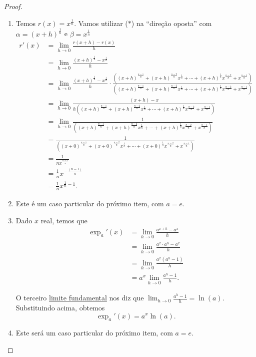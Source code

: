 \begin{proof}
\begin{enumerate}
		\item Temos $r(x)=x^{\frac{1}{n}}$.  Vamos utilizar ($*$) na ``direção oposta'' com $\alpha=(x+h)^{\frac{1}{n}}$ e $\beta=x^{\frac{1}{n}}$
		\begin{align*}
			r'(x)
				&=\lim_{h\to 0}\frac{r(x+h)-r(x)}{h}\\
				&=\lim_{h\to 0}\frac{(x+h)^{\frac{1}{n}}-x^{\frac{1}{n}}}{h}\\
				&=\lim_{h\to 0}\frac{(x+h)^{\frac{1}{n}}-x^{\frac{1}{n}}}{h}\cdot\frac{\left((x+h)^{\frac{n-1}{n}}+(x+h)^{\frac{n-2}{n}}x^{\frac{1}{n}}+\cdots+(x+h)^{\frac{1}{n}}x^{\frac{n-2}{n}}+x^{\frac{n-1}{n}}\right)}{\left((x+h)^{\frac{n-1}{n}}+(x+h)^{\frac{n-2}{n}}x^{\frac{1}{n}}+\cdots+(x+h)^{\frac{1}{n}}x^{\frac{n-2}{n}}+x^{\frac{n-1}{n}}\right)}\\
				&=\lim_{h\to 0}\frac{(x+h)-x}{h\left((x+h)^{\frac{n-1}{n}}+(x+h)^{\frac{n-2}{n}}x^{\frac{1}{n}}+\cdots+(x+h)^{\frac{1}{n}}x^{\frac{n-2}{n}}+x^{\frac{n-1}{n}}\right)}\\
				&=\lim_{h\to 0}\frac{1}{\left((x+h)^{\frac{n-1}{n}}+(x+h)^{\frac{n-2}{n}}x^{\frac{1}{n}}+\cdots+(x+h)^{\frac{1}{n}}x^{\frac{n-2}{n}}+x^{\frac{n-1}{n}}\right)}\\
				&=\frac{1}{\left((x+0)^{\frac{n-1}{n}}+(x+0)^{\frac{n-2}{n}}x^{\frac{1}{n}}+\cdots+(x+0)^{\frac{1}{n}}x^{\frac{n-2}{n}}+x^{\frac{n-1}{n}}\right)}\\
				&=\frac{1}{nx^{\frac{n-1}{n}}}\\
				&=\frac{1}{n}x^{-\frac{(n-1)}{n}}\\
				&=\frac{1}{n}x^{\frac{1}{n}-1}.
		\end{align*}
		
		\item Este é um caso particular do próximo item, com $a=e$.
		
		\item Dado $x$ real, temos que
		\begin{align*}
			\exp_a'(x)
				&=\lim_{h\to 0}\frac{a^{x+h}-a^x}{h}\\
				&=\lim_{h\to 0}\frac{a^x\cdot a^h-a^x}{h}\\
				&=\lim_{h\to 0}\frac{a^x(a^h-1)}{h}\\
				&=a^x\lim_{h\to 0}\frac{a^h-1}{h}.
		\end{align*}
		
		O terceiro \href{../06.teo_confronto/con_lim_fund_moodle.html}{limite fundamental} nos diz que $\lim_{h\to 0}\frac{a^h-1}{h}=\ln(a)$. Substituindo acima, obtemos
		\[\exp_a'(x)=a^x\ln(a).\]		
		\item Este será um caso particular do próximo item, com $a=e$.
		

\end{enumerate}
\end{proof}
